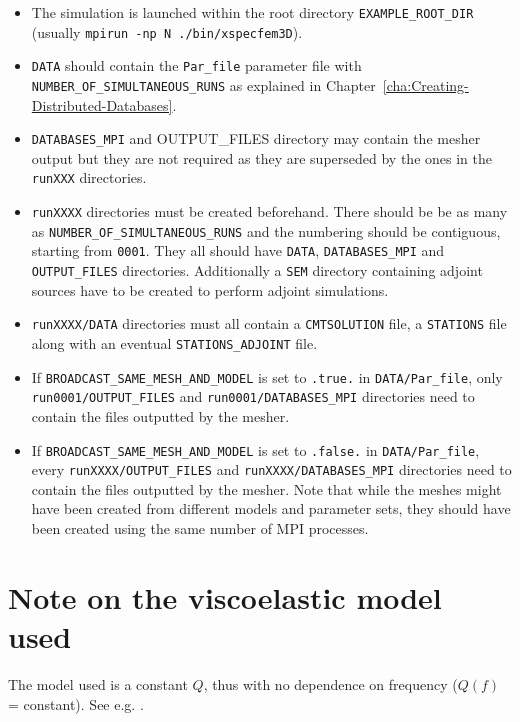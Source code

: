 \begin{itemize}
\item The simulation is launched within the root directory \texttt{EXAMPLE\_ROOT\_DIR}\\
(usually \texttt{mpirun -np N ./bin/xspecfem3D}).
\item \texttt{DATA} should contain the \texttt{Par\_file} parameter file with
\texttt{NUMBER\_OF\_SIMULTANEOUS\_RUNS} as explained in Chapter~\ref{cha:Creating-Distributed-Databases}.
\item \texttt{DATABASES\_MPI} and {OUTPUT\_FILES} directory may contain the mesher output but they
are not required as they are superseded by the ones in the \texttt{runXXX} directories.
\item \texttt{runXXXX} directories must be created beforehand. There should be be as many as
\texttt{NUMBER\_OF\_SIMULTANEOUS\_RUNS} and the numbering should be contiguous, starting from \texttt{0001}.
They all should have \texttt{DATA},
\texttt{DATABASES\_MPI} and \texttt{OUTPUT\_FILES} directories. Additionally a \texttt{SEM} directory
containing adjoint sources have to be created to perform adjoint simulations.
\item \texttt{runXXXX/DATA} directories must all contain a \texttt{CMTSOLUTION} file,
a \texttt{STATIONS} file along with an eventual \texttt{STATIONS\_ADJOINT} file.
\item If \texttt{BROADCAST\_SAME\_MESH\_AND\_MODEL} is set to \texttt{.true.} in \texttt{DATA/Par\_file},
only \texttt{run0001/OUTPUT\_FILES} and \texttt{run0001/DATABASES\_MPI} directories need to contain the files
outputted by the mesher.
\item If \texttt{BROADCAST\_SAME\_MESH\_AND\_MODEL} is set to \texttt{.false.} in \texttt{DATA/Par\_file},
every \texttt{runXXXX/OUTPUT\_FILES} and \texttt{runXXXX/DATABASES\_MPI} directories need to contain the files
outputted by the mesher. Note that while the meshes might have been created from different models and
parameter sets, they should have been created using the same number of MPI processes.
\end{itemize}


\section{Note on the viscoelastic model used}

\noindent
The model used is a constant $Q$, thus with no dependence on frequency ($Q(f)$ = constant).
See e.g. \cite{BlKoChLoXi16}. \\

